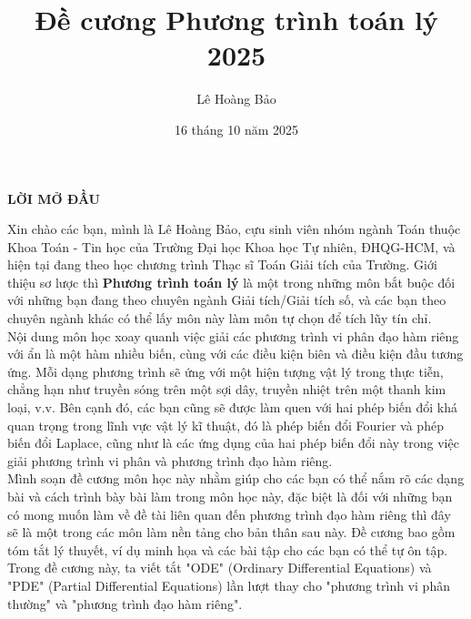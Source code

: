 \documentclass[10pt, a4paper]{article}
\title{\color{red}\textbf{Đề cương Phương trình toán lý 2025}}
\author{\color{red}Lê Hoàng Bảo}
\date{\color{red}16 tháng 10 năm 2025}
\begin{document}
	\pagestyle{fancy}
	\fancyhead{} %
	\fancyfoot{} %
	\fancyfoot[C]{\textbf\thepage}
	\renewcommand{\headrulewidth}{0.6pt}
	\renewcommand{\footrulewidth}{0.6pt}
	\maketitle\thispagestyle{empty}
	\newpage\thispagestyle{empty}
	\begin{center}
		\LARGE \textbf{LỜI MỞ ĐẦU}
	\end{center}
	
	Xin chào các bạn, mình là Lê Hoàng Bảo, cựu sinh viên nhóm ngành Toán thuộc Khoa Toán - Tin học của Trường Đại học Khoa học Tự nhiên, ĐHQG-HCM, và hiện tại đang theo học chương trình Thạc sĩ Toán Giải tích của Trường. Giới thiệu sơ lược thì \textbf{Phương trình toán lý} là một trong những môn bắt buộc đối với những bạn đang theo chuyên ngành Giải tích/Giải tích số, và các bạn theo chuyên ngành khác có thể lấy môn này làm môn tự chọn để tích lũy tín chỉ.\\
	
	Nội dung môn học xoay quanh việc giải các phương trình vi phân đạo hàm riêng với ẩn là một hàm nhiều biến, cùng với các điều kiện biên và điều kiện đầu tương ứng. Mỗi dạng phương trình sẽ ứng với một hiện tượng vật lý trong thực tiễn, chẳng hạn như truyền sóng trên một sợi dây, truyền nhiệt trên một thanh kim loại, v.v. Bên cạnh đó, các bạn cũng sẽ được làm quen với hai phép biến đổi khá quan trọng trong lĩnh vực vật lý kĩ thuật, đó là phép biến đổi Fourier và phép biến đổi Laplace, cũng như là các ứng dụng của hai phép biến đổi này trong việc giải phương trình vi phân và phương trình đạo hàm riêng.\\
	
	Mình soạn đề cương môn học này nhằm giúp cho các bạn có thể nắm rõ các dạng bài và cách trình bày bài làm trong môn học này, đặc biệt là đối với những bạn có mong muốn làm về đề tài liên quan đến phương trình đạo hàm riêng thì đây sẽ là một trong các môn làm nền tảng cho bản thân sau này. Đề cương bao gồm tóm tắt lý thuyết, ví dụ minh họa và các bài tập cho các bạn có thể tự ôn tập. Trong đề cương này, ta viết tắt "ODE" (Ordinary Differential Equations) và "PDE" (Partial Differential Equations) lần lượt thay cho "phương trình vi phân thường" và "phương trình đạo hàm riêng".\\
	
\end{document}
